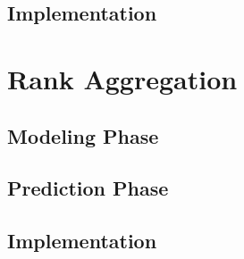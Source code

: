 \subsection{Implementation}



\section{Rank Aggregation}

\subsection{Modeling Phase}

\subsection{Prediction Phase}

\subsection{Implementation}



